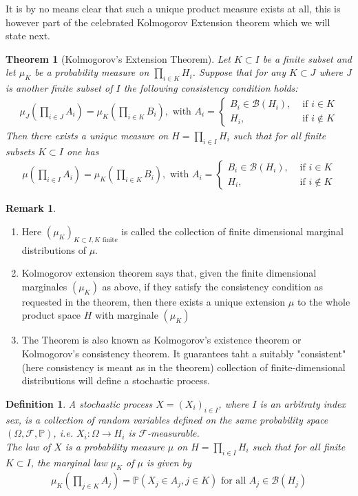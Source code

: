 \documentclass[11pt,a4paper, final]{article}
\newtheorem{thm}{Theorem}[section]
\newtheorem{defn}{Definition}[section]
\theoremstyle{definition}
\newtheorem{rem}{Remark}[section]
\begin{document}
\noindent
It is by no means clear that such a unique product measure exists at all, this is however part of the celebrated Kolmogorov Extension theorem which we will state next.
\newpage
\begin{thm}[Kolmogorov's Extension Theorem] Let $K \subset I$ be a finite subset and let $\mu_K$ be a probability measure on $\prod_{i \in K} H_i$. Suppose that for any $K \subset J$ where $J$ is another finite subset of $I$ the following consistency condition holds:
\begin{align*}
\mu_J \left( \prod_{i \in J} A_i\right) = \mu_K \left( \prod_{i \in K} B_i \right), \text{ with } A_i = \begin{cases} B_i \in \mathcal{B}(H_i), & \text{ if } i \in K \\
H_i, & \text{ if } i \notin K  \end{cases}
\end{align*}
Then there exists a unique measure on $H= \prod_{i \in I} H_i$ such that for all finite subsets $K \subset I$ one has 
\begin{align*}
\mu \left( \prod_{i \in I} A_i \right) = \mu_K \left( \prod_{i \in K } B_i \right), \text{ with } A_i = \begin{cases} B_i \in \mathcal{B}(H_i), & \text{ if } i \in K \\
H_i, & \text{ if } i \notin K \end{cases}
\end{align*}
\end{thm}
\begin{rem} \ \begin{enumerate} \item Here $( \mu_K)_{K \subset I, K \text{ finite} }$ is called the collection of finite dimensional marginal distributions of $\mu$.
\item Kolmogorov extension theorem says that, given the finite dimensional marginales $( \mu_K)$ as above, if they satisfy the consistency condition as requested in the theorem, then there exists a unique extension $\mu$ to the whole product space $H$ with marginale $(\mu_K)$ 
\item The Theorem is also known as Kolmogorov's existence theorem or Kolmogorov's consistency theorem. It guarantees taht a suitably "consistent" (here consistency is meant as in the theorem) collection of finite-dimensional distributions will define a stochastic process. 
\end{enumerate}
\end{rem}
\begin{defn} A stochastic process $X=(X_i)_{i \in I}$,  where $I$ is an arbitraty index sex, is a collection of random variables defined on the same probability space $( \Omega, \mathcal{F}, \mathbb{P})$, i.e. $X_i : \Omega \to H_i$ is $\mathcal{F}$-measurable. \\ The law of $X$ is a probability measure $ \mu$ on $H= \prod_{i \in I} H_i$ such that for all finite $K \subset I$, the marginal law $\mu_K$ of $\mu$ is given by  
\begin{align*}
\mu_K \left( \prod_{j \in K} A_j \right) = \mathbb{P}( X_j \in A_j, j \in K) \text{ for all } A_j \in \mathcal{B}(H_j) 
\end{align*}
\end{defn}
\end{document}
